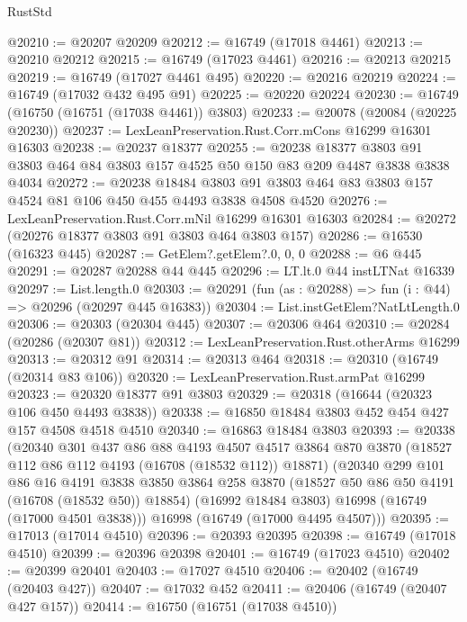 \begin{lexlean}{RustStd}
\begin{coremodule}
@20210 := @20207 @20209
@20212 := @16749 (@17018 @4461)
@20213 := @20210 @20212
@20215 := @16749 (@17023 @4461)
@20216 := @20213 @20215
@20219 := @16749 (@17027 @4461 @495)
@20220 := @20216 @20219
@20224 := @16749 (@17032 @432 @495 @91)
@20225 := @20220 @20224
@20230 := @16749 (@16750 (@16751 (@17038 @4461)) @3803)
@20233 := @20078 (@20084 (@20225 @20230))
@20237 := LexLeanPreservation.Rust.Corr.mCons @16299 @16301 @16303
@20238 := @20237 @18377
@20255 := @20238
    @18377
    @3803
    @91
    @3803
    @464
    @84
    @3803
    @157
    @4525
    @50
    @150
    @83
    @209
    @4487
    @3838
    @3838
    @4034
@20272 := @20238
    @18484
    @3803
    @91
    @3803
    @464
    @83
    @3803
    @157
    @4524
    @81
    @106
    @450
    @455
    @4493
    @3838
    @4508
    @4520
@20276 := LexLeanPreservation.Rust.Corr.mNil @16299 @16301 @16303
@20284 := @20272 (@20276 @18377 @3803 @91 @3803 @464 @3803 @157)
@20286 := @16530 (@16323 @445)
@20287 := GetElem?.getElem?.{0, 0, 0}
@20288 := @6 @445
@20291 := @20287 @20288 @44 @445
@20296 := LT.lt.{0} @44 instLTNat @16339
@20297 := List.length.{0}
@20303 := @20291 (fun (as : @20288) => fun (i : @44) => @20296 (@20297 @445 @16383))
@20304 := List.instGetElem?NatLtLength.{0}
@20306 := @20303 (@20304 @445)
@20307 := @20306 @464
@20310 := @20284 (@20286 (@20307 @81))
@20312 := LexLeanPreservation.Rust.otherArms @16299
@20313 := @20312 @91
@20314 := @20313 @464
@20318 := @20310 (@16749 (@20314 @83 @106))
@20320 := LexLeanPreservation.Rust.armPat @16299
@20323 := @20320 @18377 @91 @3803
@20329 := @20318 (@16644 (@20323 @106 @450 @4493 @3838))
@20338 := @16850 @18484 @3803 @452 @454 @427 @157 @4508 @4518 @4510
@20340 := @16863 @18484 @3803
@20393 := @20338
    (@20340
      @301
      @437
      @86
      @88
      @4193
      @4507
      @4517
      @3864
      @870
      @3870
      (@18527 @112 @86 @112 @4193 (@16708 (@18532 @112)) @18871)
      (@20340
        @299
        @101
        @86
        @16
        @4191
        @3838
        @3850
        @3864
        @258
        @3870
        (@18527 @50 @86 @50 @4191 (@16708 (@18532 @50)) @18854)
        (@16992 @18484 @3803)
        @16998
        (@16749 (@17000 @4501 @3838)))
      @16998
      (@16749 (@17000 @4495 @4507)))
@20395 := @17013 (@17014 @4510)
@20396 := @20393 @20395
@20398 := @16749 (@17018 @4510)
@20399 := @20396 @20398
@20401 := @16749 (@17023 @4510)
@20402 := @20399 @20401
@20403 := @17027 @4510
@20406 := @20402 (@16749 (@20403 @427))
@20407 := @17032 @452
@20411 := @20406 (@16749 (@20407 @427 @157))
@20414 := @16750 (@16751 (@17038 @4510))

\end{coremodule}
\end{lexlean}
